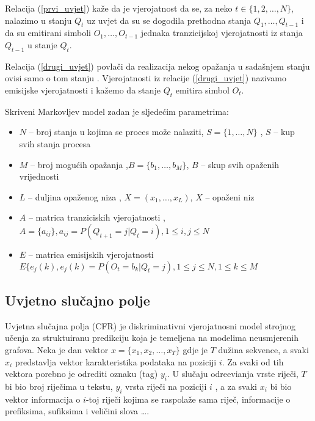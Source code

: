 \documentclass[conference]{IEEEtran}
\begin{document}
Relacija (\ref{prvi_uvjet}) ka\v{z}e da je vjerojatnost da se, za neko $ t \in \{1,2,\ldots , N \}$, nalazimo u stanju $Q_t$ uz uvjet da su se dogodila prethodna stanja $Q_1, \ldots, Q_{t-1} $ i da su emitirani simboli $O_1, \ldots , O_{t-1} $ jednaka tranzicijskoj vjerojatnosti iz stanja $Q_{t-1}$ u stanje $Q_t$.


Relacija (\ref{drugi_uvjet}) povla\v{c}i da realizacija nekog opa\v{z}anja u sada\v{s}njem stanju ovisi samo o tom stanju . Vjerojatnosti iz relacije (\ref{drugi_uvjet}) nazivamo emisijske vjerojatnosti i ka\v{z}emo da stanje $Q_t$ emitira simbol $O_t$. 

Skriveni Markovljev model zadan je sljede\'cim parametrima:
\begin{itemize}
\item $N$ -- broj stanja u kojima se proces mo\v{z}e nalaziti, $ S = \{1, \ldots, N\}$ , $S$ -- kup svih stanja procesa
\item $M$ -- broj mogu\'cih opa\v{z}anja ,$B = \{ b_1, \ldots, b_M\}$, $B$ -- skup svih opa\v{z}enih vrijednosti
\item $L$ -- duljina opa\v{z}enog niza ,  $X=(x_1,\ldots , x_L)$, $X$ -- opa\v{z}eni niz 
\item $A$ -- matrica tranziciskih vjerojatnosti , $ A = \{a_{ij}\}, a_{ij} = P(Q_{t+1} = j | Q_t = i ) , 1 \leq i,j \leq N$
\item $E$ -- matrica emisijskih vjerojatnosti $E\{ e_j(k), e_j(k) = P ( O_t = b_k | Q_t = j) , 1 \leq j \leq N , 1 \leq k \leq M$ 
\end{itemize}
\subsection{Uvjetno slu\v{c}ajno polje}
Uvjetna slu\v{c}ajna polja (CFR) je diskriminativni vjerojatnosni model strojnog u\v{c}enja za struktuiranu predikciju koja je temeljena  na modelima neusmjerenih grafova. Neka je dan vektor $x = \{ x_1 , x_2, \ldots , x_T\}$ gdje je $T$ du\v{z}ina sekvence, a svaki $x_i$ predstavlja vektor karakteristika podataka na poziciji $i$. Za svaki od tih vektora porebno je odrediti oznaku (tag) $y_i$. U slu\v{c}aju odre\dj{}evianja vrste rije\v{c}i, $T$ bi bio broj rije\v{c}ima u tekstu, $y_i$ vrsta rije\v{c}i  na poziciji $i$ , a za svaki $x_i$ bi bio vektor informacija o $i$-toj rije\v{c}i   kojima se raspola\v{z}e sama rije\v{c}, informacije o prefiksima, sufiksima i veli\v{c}ini slova \ldots. 
\end{document}
